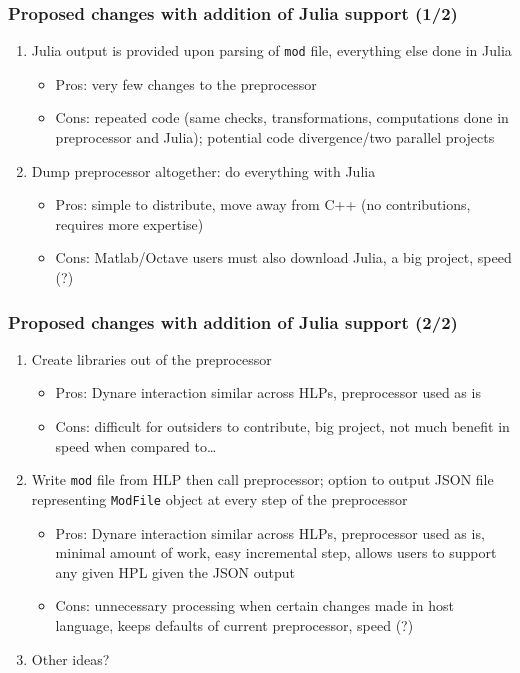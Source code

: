\documentclass{beamer}
\begin{document}
\begin{frame}
  \frametitle{Proposed changes with addition of Julia support (1/2)}
  \begin{enumerate}
  \item Julia output is provided upon parsing of \texttt{mod} file, everything else done in Julia
    \begin{itemize}
    \item Pros: very few changes to the preprocessor
    \item Cons: repeated code (same checks, transformations, computations done in preprocessor and Julia); potential code divergence/two parallel projects
    \end{itemize}
  \item Dump preprocessor altogether: do everything with Julia
    \begin{itemize}
    \item Pros: simple to distribute, move away from C++ (no contributions, requires more expertise)
    \item Cons: Matlab/Octave users must also download Julia, a big project, speed (?)
    \end{itemize}
    \asuivre
  \end{enumerate}
\end{frame}

\begin{frame}
  \frametitle{Proposed changes with addition of Julia support (2/2)}
  \begin{enumerate}
    \suite
  \item Create libraries out of the preprocessor
    \begin{itemize}
    \item Pros: Dynare interaction similar across HLPs, preprocessor used as is
    \item Cons: difficult for outsiders to contribute, big project, not much benefit in speed when compared to\ldots
    \end{itemize}
  \item Write \texttt{mod} file from HLP then call preprocessor; option to output JSON file representing \texttt{ModFile} object at every step of the preprocessor
    \begin{itemize}
    \item Pros: Dynare interaction similar across HLPs, preprocessor used as is, minimal amount of work, easy incremental step, allows users to support any given HPL given the JSON output
    \item Cons: unnecessary processing when certain changes made in host language, keeps defaults of current preprocessor, speed (?)
    \end{itemize}
  \item Other ideas?
  \end{enumerate}
\end{frame}
\end{document}
